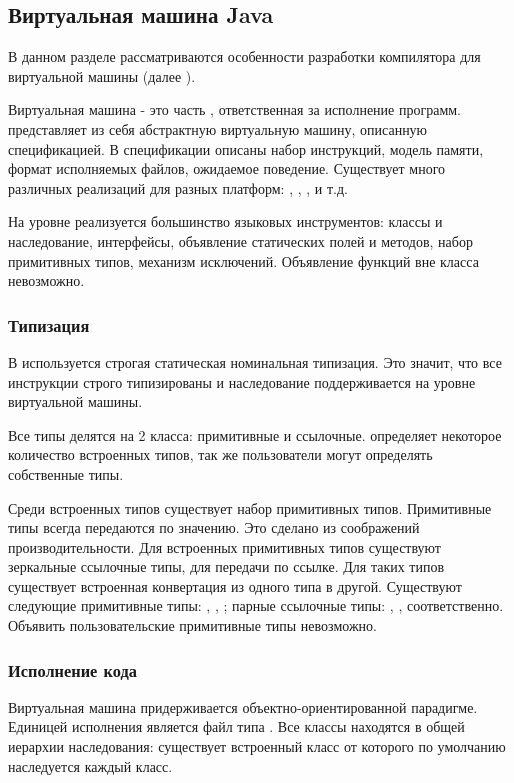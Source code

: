 \subsection{Виртуальная машина Java}
В данном разделе рассматриваются особенности разработки компилятора для виртуальной машины (далее ).

Виртуальная машина  - это часть , ответственная за исполнение программ.  представляет из себя абстрактную виртуальную машину, описанную спецификацией\cite{jvm:specification}. В спецификации описаны набор инструкций, модель памяти, формат исполняемых файлов, ожидаемое поведение. Существует много различных реализаций  для разных платформ: , , ,  и т.д.

На уровне  реализуется большинство языковых инструментов: классы и наследование, интерфейсы, объявление статических полей и методов, набор примитивных типов, механизм исключений. Объявление функций вне класса невозможно.

\subsubsection{Типизация}
В  используется строгая статическая номинальная типизация. Это значит, что все инструкции строго типизированы и наследование поддерживается на уровне виртуальной машины.

Все типы делятся на 2 класса: примитивные и ссылочные.  определяет некоторое количество встроенных типов, так же пользователи могут определять собственные типы.

Среди встроенных типов существует набор примитивных типов. Примитивные типы всегда передаются по значению. Это сделано из соображений производительности. Для встроенных примитивных типов существуют зеркальные ссылочные типы, для передачи по ссылке. Для таких типов существует встроенная конвертация из одного типа в другой. Существуют следующие примитивные типы: , , ; парные ссылочные типы: , ,  соответственно. Объявить пользовательские примитивные типы невозможно.

\subsubsection{Исполнение кода}
Виртуальная машина  придерживается объектно-ориентированной парадигме. Единицей исполнения является файл типа . Все классы находятся в общей иерархии наследования: существует встроенный класс  от которого по умолчанию наследуется каждый класс.

